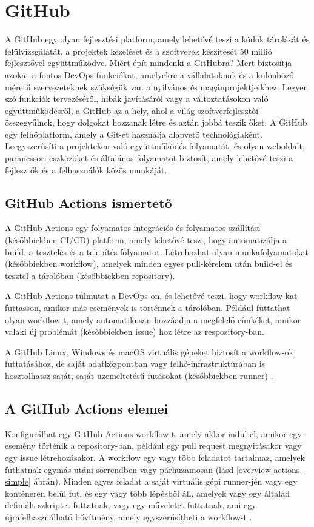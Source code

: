 \section{GitHub}
A GitHub egy olyan fejlesztési platform, amely lehetővé teszi a kódok tárolását és felülvizsgálatát, a projektek kezelését és a szoftverek készítését 50 millió fejlesztővel együttműködve.
Miért épít mindenki a GitHubra? Mert biztosítja azokat a fontos DevOps funkciókat, amelyekre a vállalatoknak és a különböző méretű szervezeteknek szükségük van a nyilvános és magánprojektjeikhez.
Legyen szó funkciók tervezéséről, hibák javításáról vagy a változtatásokon való együttműködésről, a GitHub az a hely, ahol a világ szoftverfejlesztői összegyűlnek, hogy dolgokat hozzanak létre és aztán jobbá teszik őket.
A GitHub egy felhőplatform, amely a Git-et használja alapvető technológiaként.
Leegyszerűsíti a projekteken való együttműködés folyamatát, és olyan weboldalt, parancssori eszközöket és általános folyamatot biztosít, amely lehetővé teszi a fejlesztők és a felhasználók közös munkáját.

\subsection{GitHub Actions ismertető}
A GitHub Actions egy folyamatos integrációs és folyamatos szállítási (későbbiekben CI/CD) platform, amely lehetővé teszi, hogy automatizálja a build, a tesztelés és a telepítés folyamatot.
Létrehozhat olyan munkafolyamatokat (későbbiekben workflow), amelyek minden egyes pull-kérelem után build-el és tesztel a tárolóban (későbbiekben repository).

A GitHub Actions túlmutat a DevOps-on, és lehetővé teszi, hogy workflow-kat futtasson, amikor más események is történnek a tárolóban.
Például futtathat olyan workflow-t, amely automatikusan hozzáadja a megfelelő címkéket, amikor valaki új problémát (későbbiekben issue) hoz létre az respository-ban.

A GitHub Linux, Windows és macOS virtuális gépeket biztosít a workflow-ok futtatásához, de saját adatközpontban vagy felhő-infrastruktúrában is hosztolhatsz saját, saját üzemeltetésű futásokat (későbbiekben runner) \cite{github}.

\subsection{A GitHub Actions elemei}
Konfigurálhat egy GitHub Actions workflow-t, amely akkor indul el, amikor egy esemény történik a repository-ban, például egy pull request megnyitásakor vagy egy issue létrehozásakor.
A workflow egy vagy több feladatot tartalmaz, amelyek futhatnak egymás utáni sorrendben vagy párhuzamosan (lásd \ref{overview-actions-simple} ábrán).
Minden egyes feladat a saját virtuális gépi runner-jén vagy egy konténeren belül fut, és egy vagy több lépésből áll, amelyek vagy egy általad definiált szkriptet futtatnak, vagy egy műveletet futtatnak, ami egy újrafelhasználható bővítmény, amely egyszerűsítheti a workflow-t \cite{github}.


